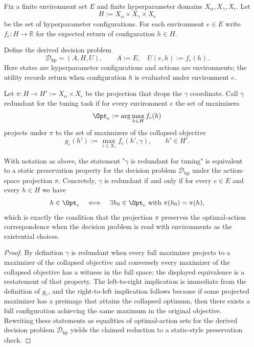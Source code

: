 Fix a finite environment set $E$ and finite hyperparameter domains $X_{\alpha},X_{\gamma},X_{\epsilon}$. Let
\[H:=X_{\alpha}\times X_{\gamma}\times X_{\epsilon}\]
be the set of hyperparameter configurations. For each environment $e\in E$ write $f_e:H\to\mathbb{R}$ for the expected return of configuration $h\in H$.

Define the derived decision problem
\[\mathcal{D}_{\mathrm{hp}}=(A,H,U),\qquad A:=E,\quad U(e,h):=f_e(h).
\]
Here states are hyperparameter configurations and actions are environments; the utility records return when configuration $h$ is evaluated under environment $e$.

Let $\pi:H\to H':=X_{\alpha}\times X_{\epsilon}$ be the projection that drops the $\gamma$ coordinate. Call $\gamma$ redundant for the tuning task if for every environment $e$ the set of maximizers
\[\Opt_e:=\arg\max_{h\in H} f_e(h)
\]
projects under $\pi$ to the set of maximizers of the collapsed objective
\[g_e(h'):=\max_{\gamma\in X_{\gamma}} f_e(h',\gamma),\qquad h'\in H'.
\]

\begin{proposition}\label{prop:hp-to-static}
With notation as above, the statement "$\gamma$ is redundant for tuning" is equivalent to a static preservation property for the decision problem $\mathcal{D}_{\mathrm{hp}}$ under the action-space projection $\pi$. Concretely, $\gamma$ is redundant if and only if for every $e\in E$ and every $h\in H$ we have
\[
h\in\Opt_e \quad\Longleftrightarrow\quad \exists h_0\in\Opt_e\text{ with }\pi(h_0)=\pi(h),
\]
which is exactly the condition that the projection $\pi$ preserves the optimal-action correspondence when the decision problem is read with environments as the existential choices.
\end{proposition}

\begin{proof}
By definition $\gamma$ is redundant when every full maximizer projects to a maximizer of the collapsed objective and conversely every maximizer of the collapsed objective has a witness in the full space; the displayed equivalence is a restatement of that property. The left-to-right implication is immediate from the definition of $g_e$, and the right-to-left implication follows because if some projected maximizer has a preimage that attains the collapsed optimum, then there exists a full configuration achieving the same maximum in the original objective. Rewriting these statements as equalities of optimal-action sets for the derived decision problem $\mathcal{D}_{\mathrm{hp}}$ yields the claimed reduction to a static-style preservation check.
\end{proof} 

